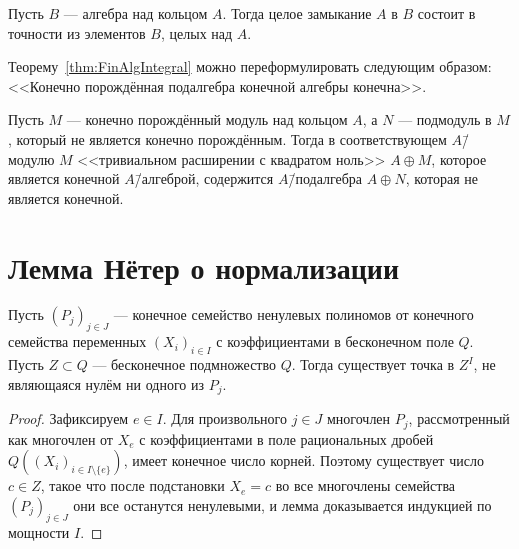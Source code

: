 \documentclass[
	extrafontsizes,
	11pt,
	hyphens,
]{memoir}
\begin{document}
\begin{corollary}
Пусть \(B\) --- алгебра над кольцом \(A\).
Тогда целое замыкание \(A\) в \(B\) состоит в точности из элементов \(B\), целых над \(A\).
\end{corollary}

\begin{remark}
Теорему~\ref{thm:FinAlgIntegral} можно переформулировать следующим образом:
<<Конечно порождённая подалгебра конечной алгебры конечна>>.
\end{remark}

\begin{example}
Пусть \(M\) --- конечно порождённый модуль над кольцом \(A\), а \(N\) --- подмодуль в \(M\), который не является конечно порождённым.
Тогда в соответствующем \(A\)\=/модулю \(M\) <<тривиальном расширении с квадратом ноль>> \(A \oplus M\), которое является конечной \(A\)\=/алгеброй, содержится \(A\)\=/подалгебра \(A \oplus N\), которая не является конечной.
\end{example}


\section{Лемма Нётер о нормализации}



\begin{lemma}
Пусть \((P_j)_{j \in J}\) --- конечное семейство ненулевых полиномов от конечного семейства переменных \((X_i)_{i \in I}\) с коэффициентами в бесконечном поле \(Q\).
\label{lem:noeth}
Пусть \(Z \subset Q\) --- бесконечное подмножество \(Q\).
Тогда существует точка в \(Z^I\), не являющаяся нулём ни одного из \(P_j\).
\end{lemma}

\begin{proof}
Зафиксируем \(e \in I\). Для произвольного \(j \in J\) многочлен \(P_j\), рассмотренный как многочлен от \(X_e\) с коэффициентами в поле рациональных дробей \(Q((X_i)_{i \in I \setminus \{e\}})\), имеет конечное число корней. Поэтому существует число \(c \in Z\), такое что после подстановки \(X_e = c\) во все многочлены семейства \((P_j)_{j \in J}\) они все останутся ненулевыми, и лемма доказывается индукцией по мощности \(I\).
\end{proof}
\end{document}
